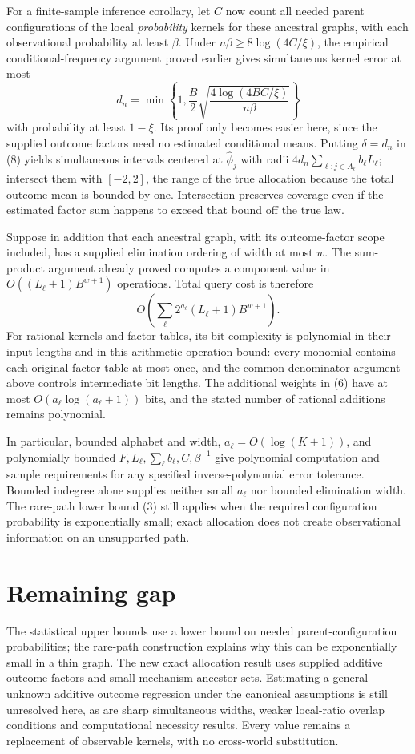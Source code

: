 \documentclass[11pt]{article}
\theoremstyle{definition}
\begin{document}
For a finite-sample inference corollary, let $C$ now count all needed
parent configurations of the local \emph{probability} kernels for these
ancestral graphs, with each observational probability at least $\beta$.
Under $n\beta\ge8\log(4C/\xi)$, the empirical conditional-frequency
argument proved earlier gives simultaneous kernel error at most
\[
 d_n=\min\left\{1,\frac B2
       \sqrt{\frac{4\log(4BC/\xi)}{n\beta}}\right\}
\]
with probability at least $1-\xi$. Its proof only becomes easier here,
since the supplied outcome factors need no estimated conditional means.
Putting $\delta=d_n$ in (8) yields simultaneous intervals centered at
$\widehat\phi_j$ with radii
$4d_n\sum_{\ell:j\in A_\ell}b_\ell L_\ell$; intersect them with
$[-2,2]$, the range of the true allocation because the total outcome
mean is bounded by one. Intersection preserves coverage even if the
estimated factor sum happens to exceed that bound off the true law.

Suppose in addition that each ancestral graph, with its outcome-factor
scope included, has a supplied elimination ordering of width at most
$w$. The sum-product argument already proved computes a component value
in $O((L_\ell+1)B^{w+1})$ operations. Total query cost is therefore
\[
 O\left(\sum_\ell2^{a_\ell}(L_\ell+1)B^{w+1}\right).
\]
For rational kernels and factor tables, its bit complexity is polynomial
in their input lengths and in this arithmetic-operation bound: every
monomial contains each original factor table at most once, and the
common-denominator argument above controls intermediate bit lengths.
The additional weights in (6) have at most $O(a_\ell\log(a_\ell+1))$
bits, and the stated number of rational additions remains polynomial.

In particular, bounded alphabet and width, $a_\ell=O(\log(K+1))$,
and polynomially bounded $F,L_\ell,\sum_\ell b_\ell,C,\beta^{-1}$
give polynomial computation and sample requirements for any specified
inverse-polynomial error tolerance. Bounded indegree alone supplies
neither small $a_\ell$ nor bounded elimination width. The rare-path
lower bound (3) still applies when the required configuration probability
is exponentially small; exact allocation does not create observational
information on an unsupported path.

\section*{Remaining gap}
The statistical upper bounds use a lower bound on needed parent-configuration
probabilities; the rare-path construction explains why this can be
exponentially small in a thin graph. The new exact allocation result uses
supplied additive outcome factors and small mechanism-ancestor sets.
Estimating a general unknown additive outcome regression under the
canonical assumptions is still unresolved here, as are sharp simultaneous
widths, weaker local-ratio overlap conditions and computational necessity
results. Every value remains a replacement of observable kernels, with
no cross-world substitution.
\end{document}
